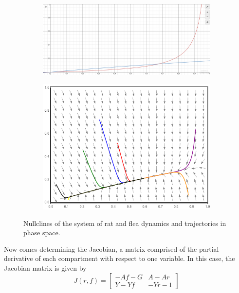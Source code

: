 \documentclass [letterpaper, 12pt] {article}
\begin{document}
\begin{figure}[h!]
	\begin{subfigure}{0.48\linewidth}
	\includegraphics[width=\linewidth]{Figures/Nullcline.png}
	\end{subfigure}
	\begin{subfigure}{0.48\linewidth}
	\includegraphics[width=\linewidth]{Figures/nullcline2.png}
	\end{subfigure}
	\caption{Nullclines of the system of rat and flea dynamics and trajectories in phase space.}
\end{figure}

Now comes determining the Jacobian,
a matrix comprised of the partial derivative of each compartment with respect to one variable.
In this case, the Jacobian matrix is given by 
\begin{equation}
J(r, f)=
\begin{bmatrix}
-Af-G & A-Ar \\
Y-Yf & -Yr-1
\end{bmatrix}
\end{equation}
\end{document}
